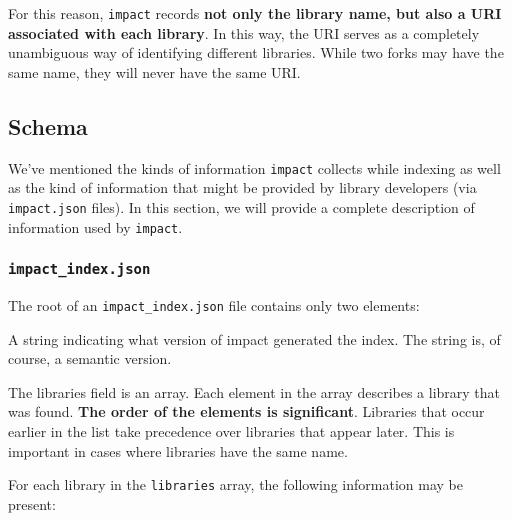 \documentclass[11pt,a4paper,twocolumn]{article}
\newcommand{\code}[1]{\texttt{#1}} %
\begin{document}
For this reason, \code{impact} records \textbf{not only the library name,
  but also a URI associated with each library}.  In this way, the URI
serves as a completely unambiguous way of identifying different
libraries.  While two forks may have the same name, they will never
have the same URI.

\subsection{Schema}

We've mentioned the kinds of information \code{impact} collects while
indexing as well as the kind of information that might be provided by
library developers (via \code{impact.json} files).  In this section,
we will provide a complete description of information used by
\code{impact}.

\subsubsection{\code{impact\_index.json}}
\label{sec:index_schema}

The root of an \code{impact\_index.json} file contains only two
elements:

\begin{description}[noitemsep]
  \item[\code{version}] A string indicating what version of impact
    generated the index.  The string is, of course, a semantic
    version.
  \item[\code{libraries}] The libraries field is an array.  Each
    element in the array describes a library that was found.  \textbf{The
      order of the elements is significant}.  Libraries that occur
    earlier in the list take precedence over libraries that appear
    later.  This is important in cases where libraries have the same
    name.
\end{description}

For each library in the \code{libraries} array, the following
information may be present:
\end{document}
